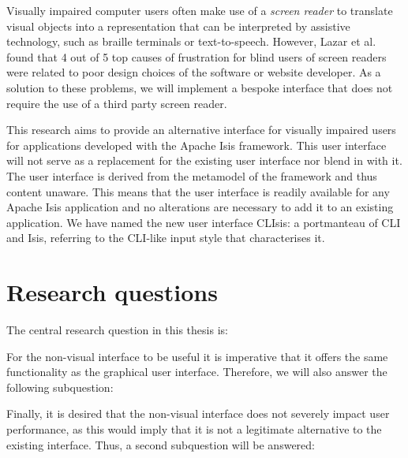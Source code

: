 Visually impaired computer users often make use of a \textit{screen reader} to translate visual objects into a representation that can be interpreted by assistive technology, such as braille terminals or text-to-speech. However, Lazar et al. found that 4 out of 5 top causes of frustration for blind users of screen readers were related to poor design choices of the software or website developer\cite{lazar2007frustrates}. As a solution to these problems, we will implement a bespoke interface that does not require the use of a third party screen reader.

This research aims to provide an alternative interface for visually impaired users for applications developed with the Apache Isis\cite{Apach60:online} framework. This user interface will not serve as a replacement for the existing user interface nor blend in with it. The user interface is derived from the metamodel of the framework and thus content unaware. This means that the user interface is readily available for any Apache Isis application and no alterations are necessary to add it to an existing application. We have named the new user interface CLIsis: a portmanteau of CLI and Isis, referring to the CLI-like input style that characterises it.

\section{Research questions}
\label{section:researchquestions}
The central research question in this thesis is:

 \label{RQ1}

\noindent For the non-visual interface to be useful it is imperative that it offers the same functionality as the graphical user interface. Therefore, we will also answer the following subquestion:

 \label{RQ2}

\noindent Finally, it is desired that the non-visual interface does not severely impact user performance, as this would imply that it is not a legitimate alternative to the existing interface. Thus, a second subquestion will be answered:

 \label{RQ3}

